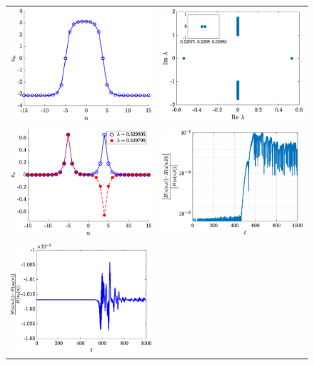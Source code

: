 \documentclass[12pt,reqno]{amsart}
\begin{document}
\begin{figure}
	\begin{center}
	\begin{tabular}{cc}
	\includegraphics[width=6cm]{unstablekak.eps} &
	\includegraphics[width=6cm]{unstablekakspec.eps} \\
	\includegraphics[width=6cm]{unstablekakgoldstone.eps} &
	\includegraphics[width=6cm]{kakunstableenergylog.eps} \\
	\includegraphics[width=6cm]{kakenergydiff.eps} &

\end{tabular}
\end{center}
\end{figure}
\end{document}
